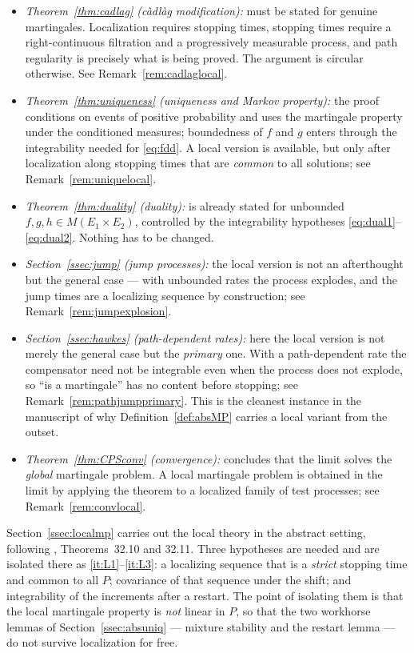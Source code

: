 \documentclass[11pt,a4paper]{article}
\theoremstyle{plain}
\theoremstyle{definition}
\theoremstyle{remark}
\newcommand{\Meas}{M}                          %
\newcommand{\KA}{\cite{Kal21}}
\begin{document}
\begin{itemize}
\item \emph{Theorem~\ref{thm:cadlag} (c\`adl\`ag modification):} must be stated
  for genuine martingales.  Localization requires stopping times, stopping times
  require a right-continuous filtration and a progressively measurable process,
  and path regularity is precisely what is being proved.  The argument is
  circular otherwise.  See Remark~\ref{rem:cadlaglocal}.
\item \emph{Theorem~\ref{thm:uniqueness} (uniqueness and Markov property):} the
  proof conditions on events of positive probability and uses the martingale
  property under the conditioned measures; boundedness of $f$ and $g$ enters
  through the integrability needed for \eqref{eq:fdd}.  A local version is
  available, but only after localization along stopping times that are
  \emph{common} to all solutions; see Remark~\ref{rem:uniquelocal}.
\item \emph{Theorem~\ref{thm:duality} (duality):} is already stated for
  unbounded $f,g,h \in \Meas(E_1 \times E_2)$, controlled by the integrability
  hypotheses \eqref{eq:dual1}--\eqref{eq:dual2}.  Nothing has to be changed.
\item \emph{Section~\ref{ssec:jump} (jump processes):} the local version is not
  an afterthought but the general case --- with unbounded rates the process
  explodes, and the jump times are a localizing sequence by construction; see
  Remark~\ref{rem:jumpexplosion}.
\item \emph{Section~\ref{ssec:hawkes} (path-dependent rates):} here the local
  version is not merely the general case but the \emph{primary} one.  With a
  path-dependent rate the compensator need not be integrable even when the
  process does not explode, so ``is a martingale'' has no content before
  stopping; see Remark~\ref{rem:pathjumpprimary}.  This is the cleanest instance
  in the manuscript of why Definition~\ref{def:absMP} carries a local variant
  from the outset.
\item \emph{Theorem~\ref{thm:CPSconv} (convergence):} concludes that the limit
  solves the \emph{global} martingale problem.  A local martingale problem is
  obtained in the limit by applying the theorem to a localized family of test
  processes; see Remark~\ref{rem:convlocal}.
\end{itemize}

\noindent
Section~\ref{ssec:localmp} carries out the local theory in the abstract setting,
following \KA, Theorems~32.10 and 32.11.  Three hypotheses are needed and are
isolated there as \ref{it:L1}--\ref{it:L3}: a localizing sequence that is a
\emph{strict} stopping time and common to all $P$; covariance of that sequence
under the shift; and integrability of the increments after a restart.  The point
of isolating them is that the local martingale property is \emph{not} linear in
$P$, so that the two workhorse lemmas of Section~\ref{ssec:absuniq} --- mixture
stability and the restart lemma --- do not survive localization for free.
\end{document}

